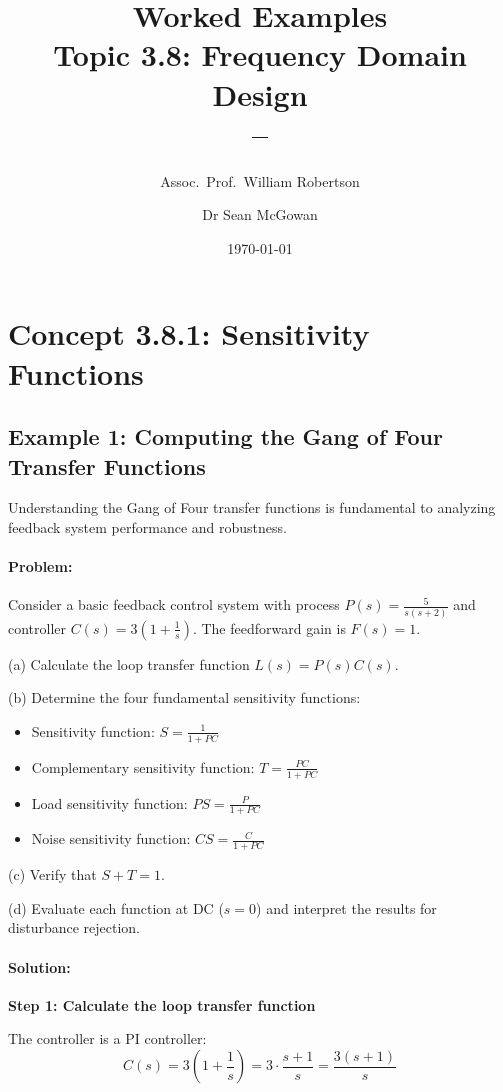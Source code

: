 \documentclass[11pt,a4paper]{article}
\title{\textbf{Worked Examples}\\[0.5em]
\large Topic 3.8: Frequency Domain Design\\[0.3em]
\normalsize \coursesubtitle{} -- \coursetitle}
\author{Assoc.\ Prof.\ William Robertson \and Dr Sean McGowan}
\date{\today}
\begin{document}
\maketitle
\tableofcontents
\newpage

\section{Concept 3.8.1: Sensitivity Functions}

\subsection{Example 1: Computing the Gang of Four Transfer Functions}

Understanding the Gang of Four transfer functions is fundamental to analyzing feedback system performance and robustness.

\paragraph{Problem:} 
Consider a basic feedback control system with process $P(s) = \frac{5}{s(s+2)}$ and controller $C(s) = 3(1 + \frac{1}{s})$. The feedforward gain is $F(s) = 1$.

(a) Calculate the loop transfer function $L(s) = P(s)C(s)$.

(b) Determine the four fundamental sensitivity functions:
\begin{itemize}
    \item Sensitivity function: $S = \frac{1}{1+PC}$
    \item Complementary sensitivity function: $T = \frac{PC}{1+PC}$
    \item Load sensitivity function: $PS = \frac{P}{1+PC}$
    \item Noise sensitivity function: $CS = \frac{C}{1+PC}$
\end{itemize}

(c) Verify that $S + T = 1$.

(d) Evaluate each function at DC ($s = 0$) and interpret the results for disturbance rejection.

\paragraph{Solution:}

\textbf{Step 1: Calculate the loop transfer function}

The controller is a PI controller:
\[
C(s) = 3\left(1 + \frac{1}{s}\right) = 3\cdot\frac{s+1}{s} = \frac{3(s+1)}{s}
\]
\end{document}
